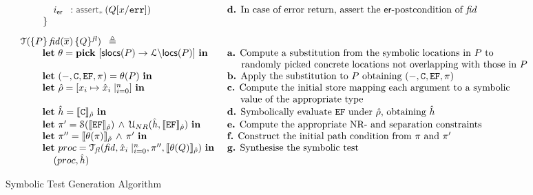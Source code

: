 \begin{figure}
{$$\begin{array}{ll}
             \dspc \dspc \dspc \procerrlab \, \, \, : \sepassert(Q[\jvar/\procerrvar])
                  & \text{  {\bf d.}  In case of error return,  assert the $\ferror$-postcondition of $\fid$} \\ 
         \ \ \ \ \ \ \ \} \\[8pt]
%         
\testify{}(\specsig{P}{\fid(\jvec{x})}{Q}{\flag}) \ \semeq & \\      
    \dspc \dspc  \mathbf{let} \ \subst = \mathbf{pick} \ \functionset{\aslocs(P)}{\locs \backslash \eflocs(P)} \ \mathbf{in} 
           & \text{  {\bf a.}  Compute a substitution from the symbolic locations in $P$ to} \\ 
           & \text{ $\phantom{a.}\ $ randomly picked concrete locations not overlapping with those in $P$}  \\
    \dspc \dspc  \mathbf{let} \ (-, \cells, \efs, \pc) = \subst(P) \ \mathbf{in}  
            & \text{  {\bf b.}  Apply the substitution to $P$ obtaining $(-, \cells, \efs, \pc)$}  \\
    \dspc \dspc  \mathbf{let} \ \sstore = [ \jvar_i \mapsto \svar_i \mid_{i=0}^n] \ \mathbf{in} 
            & \text{  {\bf c.} Compute the initial store mapping each argument to a symbolic}  \\
            & \text{ $\phantom{c.} \ $  value of the appropriate type}  \\
    \dspc \dspc  \mathbf{let} \ \sheap = \symbeval{\cells}{\sstore} \ \mathbf{in} 
           & \text{  {\bf d.}  Symbolically evaluate $\efs$ under $\sstore$, obtaining $\sheap$}  \\
    \dspc \dspc  \mathbf{let} \ \pc' = \sanity{\symbeval{\efs}{\sstore}} \, \wedge \,  \unificationef{\sheap}{\symbeval{\efs}{\sstore}}  \ \mathbf{in} 
           & \text{  {\bf e.}  Compute the appropriate NR- and separation constraints}  \\
      \dspc \dspc  \mathbf{let} \ \pc'' = \symbeval{\subst(\pc)}{\sstore} \, \wedge \, \pc'  \ \mathbf{in} 
          & \text{  {\bf f.} Construct the initial path condition from $\pc$ and $\pc'$}  \\
       \dspc \dspc  \mathbf{let} \ \proc = \testify{\flag}(\fid, \svar_i\mid_{i=0}^n, \pc'', \symbeval{\subst(Q)}{\sstore})  \ \mathbf{in} 
          & \text{  {\bf g.} Synthesise the symbolic test} \\
      \dspc \dspc \dspc (\proc, \sheap) 
\end{array}
$$}
\vspace*{-0.2cm}
\caption{Symbolic Test Generation Algorithm~\label{fig:test:generation}}
\vspace*{-0.2cm}
\end{figure}


